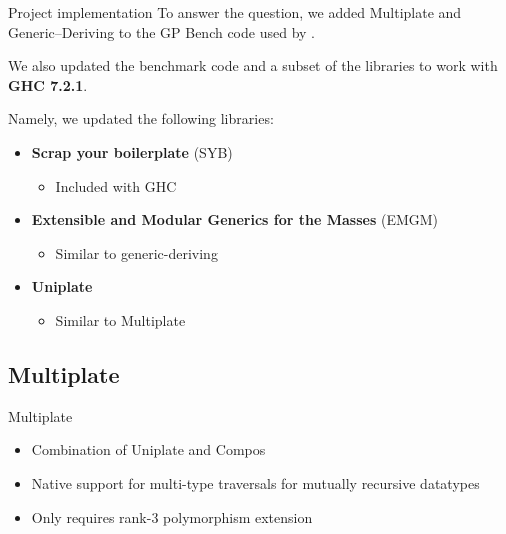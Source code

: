 \documentclass[10pt]{beamer}
\begin{document}
\begin{frame}{Project implementation}
To answer the question, we added Multiplate and Generic--Deriving to the GP Bench code used by \citet{Rodriguez:2008:art}.

We also updated the benchmark code and a subset of the libraries to work with \textbf{GHC 7.2.1}.

Namely, we updated the following libraries:
\begin{itemize}
\item \textbf{Scrap your boilerplate} (SYB)
\begin{itemize}
\item Included with GHC
\end{itemize}
\item \textbf{Extensible and Modular Generics for the Masses} (EMGM)
\begin{itemize}
\item Similar to generic-deriving
\end{itemize}
\item \textbf{Uniplate}
\begin{itemize}
\item Similar to Multiplate
\end{itemize}
\end{itemize}

\end{frame}

\subsection{Multiplate}
\begin{frame}{Multiplate}

\begin{itemize}
	\item Combination of Uniplate and Compos
	\item Native support for multi-type traversals for mutually recursive datatypes
	\item Only requires rank-3 polymorphism extension
\end{itemize}

\end{frame}
\end{document}

